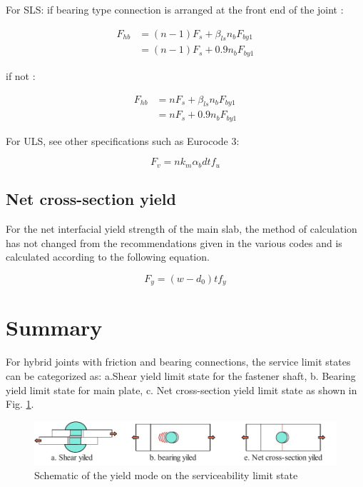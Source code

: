 For SLS:
if bearing type connection is arranged at the front end of the joint :

\begin{equation}
\begin{aligned}
    F_{hb} &= (n-1) F_s + \beta_{ls} n_b F_{by1}\\
           &= (n-1) F_s + 0.9 n_b F_{by1}
\end{aligned}
\end{equation}

if not :

\begin{equation}
\begin{aligned}
    F_{hb} &= n F_s + \beta_{ls} n_b F_{by1}\\
           &= n F_s + 0.9 n_b F_{by1}
\end{aligned}
\end{equation}

For ULS, see other specifications such as Eurocode 3:

\begin{equation}
    F_v = n k_m \alpha_b d t f_{u}
\end{equation}


\subsection{Net cross-section yield}

For the net interfacial yield strength of the main slab, the method of calculation has not changed from the recommendations given in the various codes and is calculated according to the following equation.

\begin{equation}
    F_y = (w-d_0) t f_y
\end{equation}


\section{Summary}

For hybrid joints with friction and bearing connections, the service limit states can be categorized as: a.Shear yield limit state for the fastener shaft, b. Bearing yield limit state for main plate, c. Net cross-section yield limit state as shown in Fig. \ref{fig-schehysls}.

\begin{figure}[htbp]
    \centering
    \includegraphics{imgs/ch7/sche-hy-sls.pdf}
    \caption{Schematic of the yield mode on the serviceability limit state}
    \label{fig-schehysls}
\end{figure}

